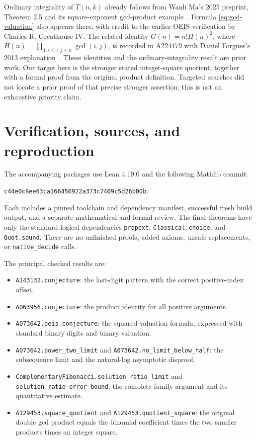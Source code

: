 \documentclass[11pt]{article}
\begin{document}
Ordinary integrality of $T(n,k)$ already follows from Wanli Ma's
2025 preprint, Theorem 2.5 and its square-exponent gcd-product
example~\cite{Ma}. Formula \eqref{eq:gcd-valuation} also appears there,
with credit to the earlier OEIS verification by Charles R. Greathouse IV.
The related identity $G(n)=n!H(n)^2$, where
$H(n)=\prod_{1\le i<j\le n}\gcd(i,j)$, is recorded in A224479 with
Daniel Forgues's 2013 explanation~\cite{A224479}.
These identities and the ordinary-integrality result are prior work.
Our target here is the stronger stated integer-square quotient, together
with a formal proof from the original product definition. Targeted
searches did not locate a prior proof of that precise stronger assertion;
this is not an exhaustive priority claim.

\section{Verification, sources, and reproduction}

The accompanying packages use Lean 4.19.0 and the following Mathlib commit:
\begin{center}
\texttt{c44e0c8ee63ca166450922a373c7409c5d26b00b}.
\end{center}
Each includes a pinned toolchain and dependency manifest, successful fresh
build output, and a separate mathematical and formal review. The final
theorems have only the standard logical dependencies
\texttt{propext}, \texttt{Classical.choice}, and \texttt{Quot.sound}.
There are no unfinished proofs, added axioms, unsafe replacements, or
\texttt{native\_decide} calls.

The principal checked results are:
\begin{itemize}
\item \texttt{A143132.conjecture}: the last-digit pattern with the correct
positive-index offset.
\item \texttt{A063956.conjecture}: the product identity for all positive
arguments.
\item \texttt{A073642.oeis\_conjecture}: the squared-valuation formula,
expressed with standard binary digits and binary valuation.
\item \texttt{A073642.power\_two\_limit} and
\texttt{A073642.no\_limit\_below\_half}: the subsequence limit and the
natural-log asymptotic disproof.
\item \texttt{ComplementaryFibonacci.solution\_ratio\_limit} and
\texttt{solution\_ratio\_error\_bound}: the complete family argument
and its quantitative estimate.
\item \texttt{A129453.square\_quotient} and \texttt{A129453.quotient\_square}: the original
double gcd product equals the binomial coefficient times the two
smaller products times an integer square.
\end{itemize}
\end{document}

